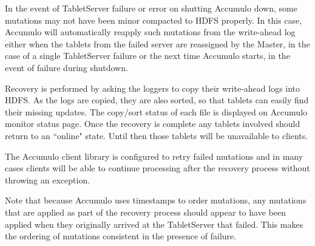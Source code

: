 In the event of TabletServer failure or error on shutting Accumulo down, some
mutations may not have been minor compacted to HDFS properly. In this case,
Accumulo will automatically reapply such mutations from the write-ahead log
either when the tablets from the failed server are reassigned by the Master, in the
case of a single TabletServer failure or the next time Accumulo starts, in the event of
failure during shutdown.

Recovery is performed by asking the loggers to copy their write-ahead logs into HDFS.
As the logs are copied, they are also sorted, so that tablets can easily find their missing
updates. The copy/sort status of each file is displayed on
Accumulo monitor status page. Once the recovery is complete any
tablets involved should return to an ``online" state. Until then those tablets will be
unavailable to clients.

The Accumulo client library is configured to retry failed mutations and in many
cases clients will be able to continue processing after the recovery process without
throwing an exception.

Note that because Accumulo uses timestamps to order mutations, any mutations
that are applied as part of the recovery process should appear to have been applied
when they originally arrived at the TabletServer that failed. This makes the ordering
of mutations consistent in the presence of failure.

